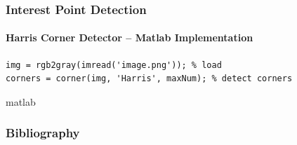 \documentclass[xetex,professionalfont]{beamer}
\begin{document}

\begin{frame}[fragile]
\frametitle{Interest Point Detection}
\framesubtitle{Harris Corner Detector -- Matlab Implementation}

\begin{verbatim}
img = rgb2gray(imread('image.png')); % load
corners = corner(img, 'Harris', maxNum); % detect corners
\end{verbatim}{matlab}

\end{frame}


\begin{frame}
\frametitle{Bibliography}

\printbibliography

\end{frame}
\end{document}
